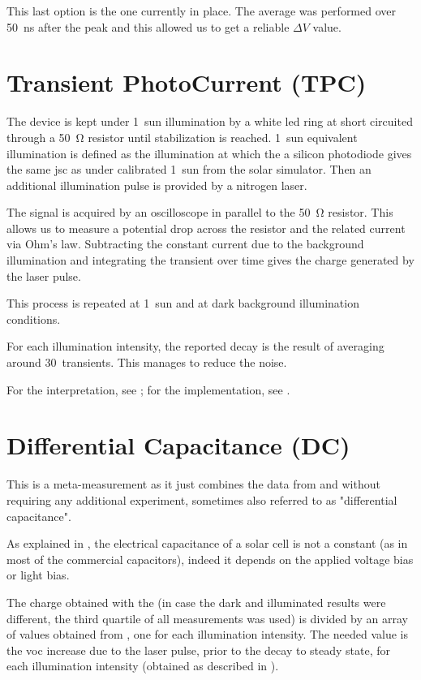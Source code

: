 	This last option is the one currently in place. The average was performed over \SI{50}{ns} after the peak and this allowed us to get a reliable $\Delta V$ value.

\section{Transient PhotoCurrent (TPC)}

	The device is kept under 1~sun illumination by a white \gls{led} ring at short circuited through a \SI{50}{\ohm} resistor until stabilization is reached. 1~sun equivalent illumination is defined as the illumination at which the a silicon photodiode gives the same \gls{jsc} as under calibrated 1~sun from the solar simulator. Then an additional illumination pulse is provided by a nitrogen laser.

	The signal is acquired by an oscilloscope in parallel to the \SI{50}{\ohm} resistor. This allows us to measure a potential drop across the resistor and the related current via Ohm's law. Subtracting the constant current due to the background illumination and integrating the transient over time gives the charge generated by the laser pulse.

	This process is repeated at 1~sun and at dark background illumination conditions.

	For each illumination intensity, the reported decay is the result of averaging around 30~transients. This manages to reduce the noise.

	For the interpretation, see ; for the implementation, see .

\section{Differential Capacitance (DC)}

	This is a meta-measurement as it just combines the data from  and  without requiring any additional experiment\cite{Shuttle2008}, sometimes also referred to as "differential capacitance".

	As explained in , the electrical capacitance of a solar cell is not a constant (as in most of the commercial capacitors), indeed it depends on the applied voltage bias or light bias.

	The charge obtained with the  (in case the dark and illuminated results were different, the third quartile of all  measurements was used) is divided by an array of values obtained from , one for each illumination intensity. The needed value is the \gls{voc} increase due to the laser pulse, prior to the decay to steady state, for each illumination intensity (obtained as described in ).

